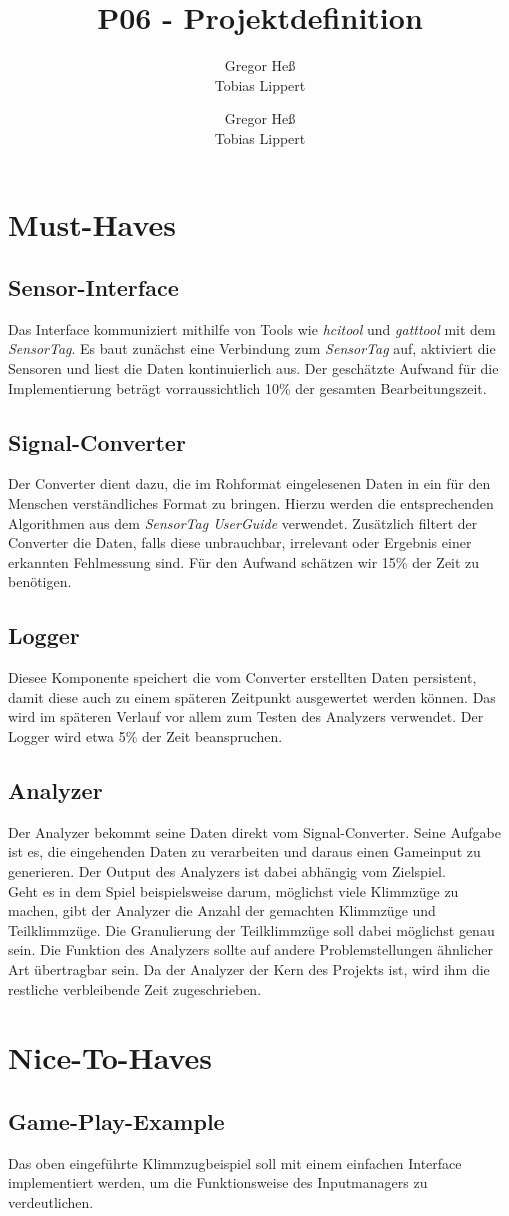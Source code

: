 \documentclass[12pt, accentcolor=tud1b, bigchapter, nochapterpage]{tudreport}
\title{\textbf{P06 - Projektdefinition}}
\subtitle{Gregor He\ss \\ Tobias Lippert}
\author{Gregor He\ss \\
		Tobias Lippert}
\date{}
\begin{document}
\maketitle

\chapter*{Must-Haves}
\section*{Sensor-Interface}
Das Interface kommuniziert mithilfe von Tools wie \emph{hcitool} und \emph{gatttool} mit dem \emph{SensorTag}. Es baut zun\"achst eine Verbindung zum \emph{SensorTag} auf, aktiviert die Sensoren und liest die Daten kontinuierlich aus. Der gesch\"atzte Aufwand f\"ur die Implementierung betr\"agt vorraussichtlich 10\% der gesamten Bearbeitungszeit.

\section*{Signal-Converter}
Der Converter dient dazu, die im Rohformat eingelesenen Daten in ein f\"ur den Menschen verst\"andliches Format zu bringen. Hierzu werden die entsprechenden Algorithmen aus dem \emph{SensorTag UserGuide} verwendet. Zus\"atzlich filtert der Converter die Daten, falls diese unbrauchbar, irrelevant oder Ergebnis einer erkannten Fehlmessung sind. F\"ur den Aufwand sch\"atzen wir 15\% der Zeit zu ben\"otigen.

\section*{Logger}
Diesee Komponente speichert die vom Converter erstellten Daten persistent, damit diese auch zu einem sp\"ateren Zeitpunkt ausgewertet werden k\"onnen. Das wird im sp\"ateren Verlauf vor allem zum Testen des Analyzers verwendet. Der Logger wird etwa 5\% der Zeit beanspruchen.

\section*{Analyzer}
Der Analyzer bekommt seine Daten direkt vom Signal-Converter. Seine Aufgabe ist es, die eingehenden Daten zu verarbeiten und daraus einen Gameinput zu generieren. Der Output des Analyzers ist dabei abh\"angig vom Zielspiel. \\
Geht es in dem Spiel beispielsweise darum, m\"oglichst viele Klimmz\"uge zu machen, gibt der Analyzer die Anzahl der gemachten Klimmz\"uge und Teilklimmz\"uge. Die Granulierung der Teilklimmz\"uge soll dabei m\"oglichst genau sein. Die Funktion des Analyzers sollte auf andere Problemstellungen \"ahnlicher Art \"ubertragbar sein. Da der Analyzer der Kern des Projekts ist, wird ihm die restliche verbleibende Zeit zugeschrieben.

\chapter*{Nice-To-Haves}
\section*{Game-Play-Example}
Das oben eingef\"uhrte Klimmzugbeispiel soll mit einem einfachen Interface implementiert werden, um die Funktionsweise des Inputmanagers zu verdeutlichen.
\end{document}
